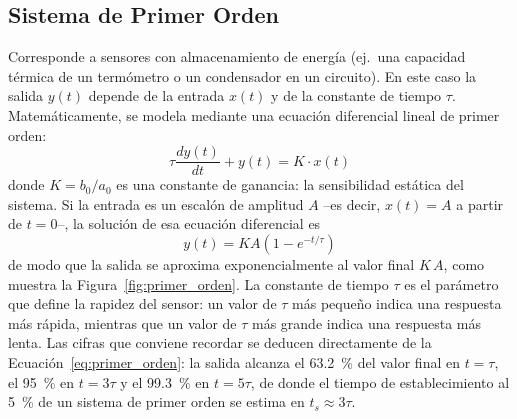 \subsection{Sistema de Primer Orden}
Corresponde a sensores con almacenamiento de energía (ej.\ una capacidad térmica de un termómetro o un condensador en un circuito). En este caso la salida $y(t)$ depende de la entrada $x(t)$ y de la constante de tiempo $\tau$. Matemáticamente, se modela mediante una ecuación diferencial lineal de primer orden:
\[ \tau \frac{dy(t)}{dt} + y(t) = K \cdot x(t) \]
donde $K = b_0/a_0$ es una constante de ganancia: la sensibilidad estática del sistema. Si la entrada es un escalón de amplitud $A$ --es decir, $x(t) = A$ a partir de $t = 0$--, la solución de esa ecuación diferencial es
\begin{equation}\label{eq:primer_orden}
    y(t) = K A \left( 1 - e^{-t/\tau} \right)
\end{equation}
de modo que la salida se aproxima exponencialmente al valor final $K\,A$, como muestra la Figura~\ref{fig:primer_orden}. La constante de tiempo $\tau$ es el parámetro que define la rapidez del sensor: un valor de $\tau$ más pequeño indica una respuesta más rápida, mientras que un valor de $\tau$ más grande indica una respuesta más lenta. Las cifras que conviene recordar se deducen directamente de la Ecuación~\eqref{eq:primer_orden}: la salida alcanza el \SI{63.2}{\percent} del valor final en $t = \tau$, el \SI{95}{\percent} en $t = 3\tau$ y el \SI{99.3}{\percent} en $t = 5\tau$, de donde el tiempo de establecimiento al \SI{5}{\percent} de un sistema de primer orden se estima en $t_s \approx 3\tau$.

